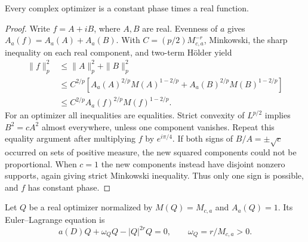 \begin{lemma}\label{foundation:constant-phase}
Every complex optimizer is a constant phase times a real function.
\end{lemma}
\begin{proof}
Write $f=A+iB$, where $A,B$ are real. Evenness of $a$ gives
$A_a(f)=A_a(A)+A_a(B)$. With
$C=(p/2)M_{c,a}^{-r}$, Minkowski, the sharp inequality on each real
component, and two-term H\"older yield
\begin{align*}
 \|f\|_p^2
 &\le\|A\|_p^2+\|B\|_p^2\\
 &\le C^{2/p}\left[
 A_a(A)^{2/p}M(A)^{1-2/p}
 +A_a(B)^{2/p}M(B)^{1-2/p}\right]\\
 &\le C^{2/p}A_a(f)^{2/p}M(f)^{1-2/p}.
\end{align*}
For an optimizer all inequalities are equalities. Strict convexity
of $L^{p/2}$ implies $B^2=cA^2$ almost everywhere, unless one
component vanishes. Repeat this equality argument after multiplying
$f$ by $e^{i\pi/4}$. If both signs of $B/A=\pm\sqrt c$ occurred
on sets of positive measure, the new squared components could
not be proportional. When $c=1$ the new components instead have
disjoint nonzero supports, again giving strict Minkowski inequality.
Thus only one sign is possible, and $f$ has constant phase.
\end{proof}

Let $Q$ be a real optimizer normalized by $M(Q)=M_{c,a}$ and
$A_a(Q)=1$. Its Euler--Lagrange equation is
\[
 a(D)Q+\omega_QQ-|Q|^{2r}Q=0,\qquad
 \omega_Q=r/M_{c,a}>0.
\]

